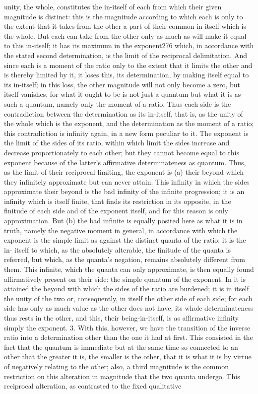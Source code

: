 unity, the whole, constitutes the in-itself of each from which their given
magnitude is distinct: this is the magnitude according to which each is
only to the extent that it takes from the other a part of their common
in-itself which is the whole. But each can take from the other only as much
as will make it equal to this in-itself; it has its maximum in the exponent276
which, in accordance with the stated second determination, is the limit of
the reciprocal delimitation. And since each is a moment of the ratio only
to the extent that it limits the other and is thereby limited by it, it loses
this, its determination, by making itself equal to its in-itself; in this loss,
the other magnitude will not only become a zero, but itself vanishes, for
what it ought to be is not just a quantum but what it is as such a quantum,
namely only the moment of a ratio. Thus each side is the contradiction
between the determination as its in-itself, that is, as the unity of the whole
which is the exponent, and the determination as the moment of a ratio;
this contradiction is infinity again, in a new form peculiar to it.
The exponent is the limit of the sides of its ratio, within which limit
the sides increase and decrease proportionately to each other; but they
cannot become equal to this exponent because of the latter’s affirmative
determinateness as quantum. Thus, as the limit of their reciprocal limiting,
the exponent is (a) their beyond which they infinitely approximate but can
never attain. This infinity in which the sides approximate their beyond is
the bad infinity of the infinite progression; it is an infinity which is itself
finite, that finds its restriction in its opposite, in the finitude of each side
and of the exponent itself, and for this reason is only approximation. But
(b) the bad infinite is equally posited here as what it is in truth, namely
the negative moment in general, in accordance with which the exponent
is the simple limit as against the distinct quanta of the ratio: it is the in-
itself to which, as the absolutely alterable, the finitude of the quanta is
referred, but which, as the quanta’s negation, remains absolutely different
from them. This infinite, which the quanta can only approximate, is then
equally found affirmatively present on their side: the simple quantum of
the exponent. In it is attained the beyond with which the sides of the
ratio are burdened; it is in itself the unity of the two or, consequently,
in itself the other side of each side; for each side has only as much value
as the other does not have; its whole determinateness thus rests in the
other, and this, their being-in-itself, is as affirmative infinity simply the
exponent.
3. With this, however, we have the transition of the inverse ratio into
a determination other than the one it had at first. This consisted in the
fact that the quantum is immediate but at the same time so connected to
an other that the greater it is, the smaller is the other, that it is what it is
by virtue of negatively relating to the other; also, a third magnitude is the
common restriction on this alteration in magnitude that the two quanta
undergo. This reciprocal alteration, as contrasted to the fixed qualitative


